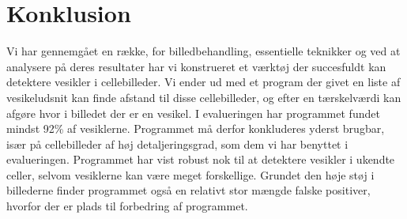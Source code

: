 \thispagestyle{plain}
\section{Konklusion}
\pagestyle{headings}

Vi har gennemgået en række, for billedbehandling, essentielle teknikker og ved at analysere på deres resultater har vi konstrueret et værktøj der succesfuldt kan detektere vesikler i cellebilleder. Vi ender ud med et program der givet en liste af vesikeludsnit kan finde afstand til disse cellebilleder, og efter en tærskelværdi kan afgøre hvor i billedet der er en vesikel. I evalueringen har programmet fundet mindst 92\% af vesiklerne. Programmet må derfor konkluderes yderst brugbar, især på cellebilleder af høj detaljeringsgrad, som dem vi har benyttet i evalueringen. Programmet har vist robust nok til at detektere vesikler i ukendte celler, selvom vesiklerne kan være meget forskellige. Grundet den høje støj i billederne finder programmet også en relativt stor mængde falske positiver, hvorfor der er plads til forbedring af programmet.